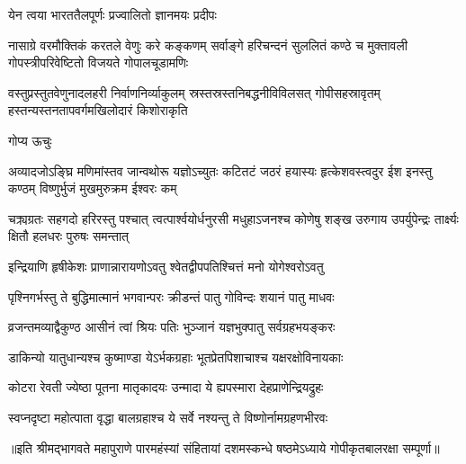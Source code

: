 

{येन त्वया भारततैलपूर्णः प्रज्वालितो ज्ञानमयः प्रदीपः}

{नासाग्रे वरमौक्तिकं करतले वेणुः करे कङ्कणम्}
{सर्वाङ्गे हरिचन्दनं सुललितं कण्ठे च मुक्तावली}
{गोपस्त्रीपरिवेष्टितो विजयते गोपालचूडामणिः}

{वस्तुप्रस्तुतवेणुनादलहरी निर्वाणनिर्व्याकुलम्}
{स्रस्तस्रस्तनिबद्धनीविविलसत् गोपीसहस्रावृतम्}
{हस्तन्यस्तनतापवर्गमखिलोदारं किशोराकृति}

गोप्य ऊचुः

\fourlineindentedshloka
{अव्यादजोऽङ्घ्रि मणिमांस्तव जान्वथोरू}
{यज्ञोऽच्युतः कटितटं जठरं हयास्यः}
{हृत्केशवस्त्वदुर ईश इनस्तु कण्ठम्}
{विष्णुर्भुजं मुखमुरुक्रम ईश्वरः कम्}

\fourlineindentedshloka
{चक्र्यग्रतः सहगदो हरिरस्तु पश्चात्}
{त्वत्पार्श्वयोर्धनुरसी मधुहाऽजनश्च}
{कोणेषु शङ्ख उरुगाय उपर्युपेन्द्रः}
{तार्क्ष्यः क्षितौ हलधरः पुरुषः समन्तात्}

\twolineshloka
{इन्द्रियाणि हृषीकेशः प्राणान्नारायणोऽवतु}
{श्वेतद्वीपपतिश्चित्तं मनो योगेश्वरोऽवतु}

\twolineshloka
{पृश्निगर्भस्तु ते बुद्धिमात्मानं भगवान्परः}
{क्रीडन्तं पातु गोविन्दः शयानं पातु माधवः}

\twolineshloka
{व्रजन्तमव्याद्वैकुण्ठ आसीनं त्वां श्रियः पतिः}
{भुञ्जानं यज्ञभुक्पातु सर्वग्रहभयङ्करः}

\twolineshloka
{डाकिन्यो यातुधान्यश्च कुष्माण्डा येऽर्भकग्रहाः}
{भूतप्रेतपिशाचाश्च यक्षरक्षोविनायकाः}

\twolineshloka
{कोटरा रेवती ज्येष्ठा पूतना मातृकादयः}
{उन्मादा ये ह्यपस्मारा देहप्राणेन्द्रियद्रुहः}

\twolineshloka
{स्वप्नदृष्टा महोत्पाता वृद्धा बालग्रहाश्च ये}
{सर्वे नश्यन्तु ते विष्णोर्नामग्रहणभीरवः}

{॥इति श्रीमद्भागवते महापुराणे पारमहंस्यां संहितायां दशमस्कन्धे षष्ठमेऽध्याये गोपीकृतबालरक्षा सम्पूर्णा॥}